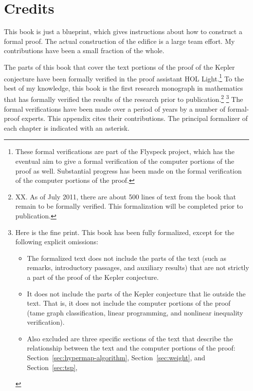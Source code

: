 
\chapter{Credits}\label{sec:credit}

This book is just a blueprint, which gives instructions about how to
construct a formal proof.  The actual construction of the edifice is a
large team effort.  My contributions have been a small fraction of the
whole.

The parts of this book that cover the text portions of the proof of
the Kepler conjecture have been formally verified in the proof
assistant HOL Light.\footnote{These formal verifications are part of
  the Flyspeck project, which has the eventual aim to give a formal
  verification of the computer portions of the proof as
  well. Substantial progress has been made on the formal verification
  of the computer portions of the proof.} 
To the best of my knowledge, this book is the first research monograph in mathematics
that has formally verified the results of the research
prior to publication.\footnote{XX.  As of July 2011, there are about
  500 lines of text from the book that remain to be formally verified.
  This formalization will be completed prior to publication.}
\footnote{ Here is the fine print.  This book has been fully
  formalized, except for the following explicit omissions:
\begin{itemize}
\item The formalized text does not include the parts of the text (such
  as remarks, introductory passages, and auxiliary results) that are
  not strictly a part of the proof of the Kepler conjecture.
\item It does not include the parts of the Kepler conjecture that lie
  outside the text. That is, it does not include the computer portions
  of the proof (tame graph classification, linear programming, and
  nonlinear inequality verification).
\item Also excluded are three specific sections of the text that describe
  the relationship between the text and the computer portions of
  the proof: Section~\ref{sec:hypermap-algorithm}, Section~\ref{sec:weight}, and Section~\ref{sec:tsp},
\end{itemize}
}
 The formal verifications
have been made over a period of years by a number of formal-proof
experts.  This appendix cites their contributions. The principal
formalizer of each chapter is indicated with an asterisk.

